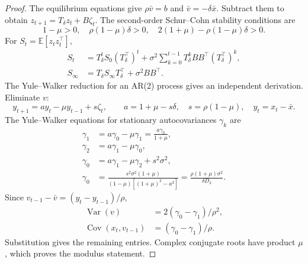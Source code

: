 \begin{proof}
The equilibrium equations give $\rho\bar v=b$ and
$\bar v=-\delta\bar x$. Subtract them to obtain
$z_{t+1}=T_\delta z_t+B\zeta_t$. The second-order Schur--Cohn stability conditions are
\begin{equation}
 1-\mu>0,\quad \rho(1-\mu)\delta>0,\quad
 2(1+\mu)-\rho(1-\mu)\delta>0.
\end{equation}
For $S_t=\mathbb E[z_tz_t^\top]$,
\begin{align}
 S_t&=T_\delta^tS_0(T_\delta^\top)^t
       +\sigma^2\sum_{k=0}^{t-1}T_\delta^kBB^\top(T_\delta^\top)^k,\\
 S_\infty&=T_\delta S_\infty T_\delta^\top+\sigma^2BB^\top.
 \label{eq:modal-lyapunov}
\end{align}
The Yule--Walker reduction for an AR(2) process
\cite{brockwell1991time} gives an independent derivation. Eliminate $v$:
\begin{equation}
 y_{t+1}=a y_t-\mu y_{t-1}+s\zeta_t,\qquad
 a=1+\mu-s\delta,\quad s=\rho(1-\mu),\quad y_t=x_t-\bar x.
\end{equation}
The Yule--Walker equations for stationary autocovariances $\gamma_k$ are
\begin{align}
 \gamma_1&=a\gamma_0-\mu\gamma_1
               =\frac{a\gamma_0}{1+\mu},\\
 \gamma_2&=a\gamma_1-\mu\gamma_0,\\
 \gamma_0&=a\gamma_1-\mu\gamma_2+s^2\sigma^2,\\
 \gamma_0&=\frac{s^2\sigma^2(1+\mu)}
                   {(1-\mu)[(1+\mu)^2-a^2]}
           =\frac{\rho(1+\mu)\sigma^2}{\delta D_\delta}.
\end{align}
Since $v_{t-1}-\bar v=(y_t-y_{t-1})/\rho$,
\begin{align}
 \operatorname{Var}(v)&=2(\gamma_0-\gamma_1)/\rho^2,\\
 \operatorname{Cov}(x_t,v_{t-1})&=(\gamma_0-\gamma_1)/\rho.
\end{align}
Substitution gives the remaining entries. Complex conjugate roots have
product $\mu$, which proves the modulus statement.
\end{proof}

